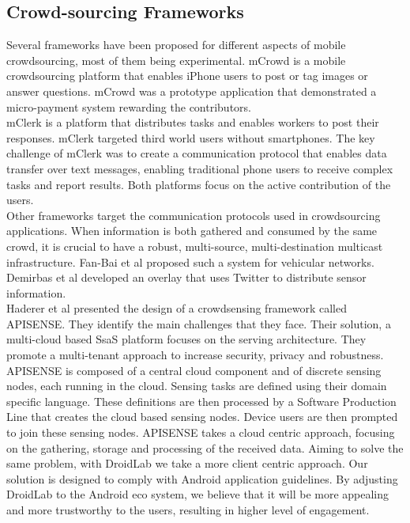 \documentclass[conference,letterpaper]{IEEEtran}
\begin{document}
\subsection{Crowd-sourcing Frameworks}
Several frameworks have been proposed for different aspects of mobile crowdsourcing, most of them being experimental. mCrowd is a mobile crowdsourcing platform that enables iPhone users to post or tag images or answer questions. mCrowd \cite{Yan} was a prototype application that demonstrated a micro-payment system rewarding the contributors.\\
\indent mClerk \cite{Gupta2012} is a platform that distributes tasks and enables workers to post their responses. mClerk targeted third world users without smartphones. The key challenge of mClerk was to create a communication protocol that enables data transfer over text messages, enabling traditional phone users to receive complex tasks and report results. Both platforms focus on the active contribution of the users.\\
\indent Other frameworks target the communication protocols used in crowdsourcing applications. When information is both gathered and consumed by the same crowd, it is crucial to have a robust, multi-source, multi-destination multicast infrastructure. Fan-Bai et al proposed such a system for vehicular networks. Demirbas et al \cite{Demirbas2010} developed an overlay that uses Twitter to distribute sensor information.\\
\indent Haderer et al \cite{Haderer2013} presented the design of a crowdsensing framework called APISENSE. They identify the main challenges that they face. Their solution, a multi-cloud based SsaS platform focuses on the serving architecture. They promote a multi-tenant approach to increase security, privacy and robustness. APISENSE is composed of a central cloud component and of discrete sensing nodes, each running in the cloud. Sensing tasks are defined using their domain specific language. These definitions are then processed by a Software Production Line that creates the cloud based sensing nodes. Device users are then prompted to join these sensing nodes. APISENSE takes a cloud centric approach, focusing on the gathering, storage and processing of the received data. Aiming to solve the same problem, with DroidLab we take a more client centric approach. Our solution is designed to comply with Android application guidelines. By adjusting DroidLab to the Android eco system, we believe that it will be more appealing and more trustworthy to the users, resulting in higher level of engagement.\\
\end{document}
